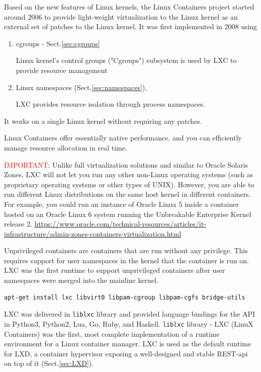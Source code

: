 Based on the new features of Linux kernels,  the Linux Containers project
started around 2006 to provide light-weight virtualization to the Linux kernel
as an external set of patches to the Linux kernel. It was first implemented in
2008 using
\begin{enumerate}
  \item cgroups - Sect.\ref{sec:cgroups}
  
   Linux kernel's control groups ("Cgroups") subsystem is used by LXC 
   to provide resource management
    
  
  \item Linux namespaces (Sect.\ref{sec:namespaces}),
  
  LXC provides resource isolation through process namespaces. 
  
\end{enumerate}
It works on a single Linux kernel without requiring any patches.

Linux Containers offer essentially native performance, and you can efficiently
manage resource allocation in real time.

\textcolor{red}{IMPORTANT}: Unlike full virtualization solutions and similar to
Oracle Solaris Zones, LXC will not let you run any other non-Linux operating
systems (such as proprietary operating systems or other types of UNIX). However,
you are able to run different Linux distributions on the same host kernel in
different containers. For example, you could run an instance of Oracle Linux 5
inside a container hosted on an Oracle Linux 6 system running the Unbreakable
Enterprise Kernel release 2.
\url{https://www.oracle.com/technical-resources/articles/it-infrastructure/admin-zones-containers-virtualization.html}

Unprivileged containers are containers that are run without any privilege. This
requires support for user namespaces in the kernel that the container is run on.
LXC was the first runtime to support unprivileged containers after user
namespaces were merged into the mainline kernel.
\begin{verbatim}
apt-get install lxc libvirt0 libpam-cgroup libpam-cgfs bridge-utils

\end{verbatim}

LXC was delivered in \verb!liblxc! library and provided language bindings for
the API in Python3, Python2, Lua, Go, Ruby, and Haskell. \verb!liblxc! library -
LXC (LinuX Containers) was the first, most complete implementation of a runtime
environment for a Linux container manager.
LXC is used as the default runtime for LXD, a container hypervisor exposing a
well-designed and stable REST-api on top of it (Sect.\ref{sec:LXD}).


